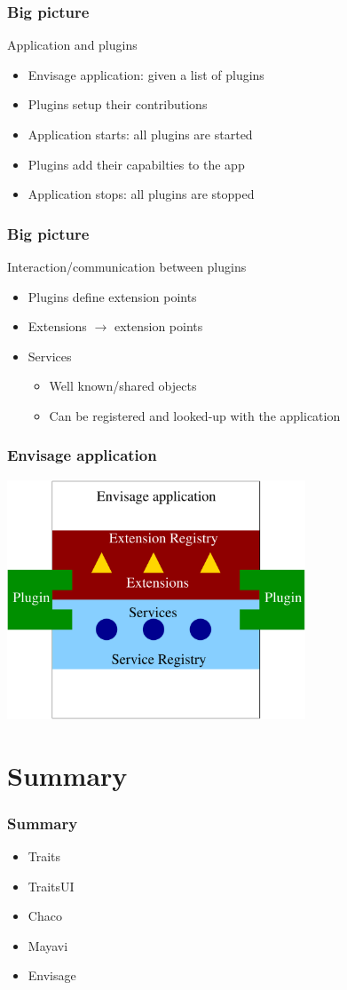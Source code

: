 \documentclass[14pt,compress]{beamer}
\begin{document}
\begin{frame}
  \frametitle{Big picture}
  \begin{block}{Application and plugins}
    \begin{itemize}
    \item Envisage application: given a list of plugins
    \item Plugins setup their contributions
    \item Application starts: all plugins are started
    \item Plugins add their capabilties to the app
    \item Application stops: all plugins are stopped
    \end{itemize}
  \end{block}
\end{frame}

\begin{frame}
  \frametitle{Big picture}
  \begin{block}{Interaction/communication between plugins}
    \begin{itemize}
    \item Plugins define extension points
    \item Extensions $\rightarrow$ extension points
    \item Services
      \begin{itemize}
      \item Well known/shared objects
      \item Can be registered and looked-up with the application
      \end{itemize}
    \end{itemize}
  \end{block}
\end{frame}

\begin{frame}
  \frametitle{Envisage application}
  \begin{center}
    \includegraphics[width=3.5in,interpolate=true]{images/envisage}
  \end{center}
\end{frame}


\section{Summary}

\begin{frame}
  \frametitle{Summary}
  \begin{itemize}
      \item Traits
      \item TraitsUI
      \item Chaco
      \item Mayavi
      \item Envisage
 \end{itemize}
\end{frame}
\end{document}
